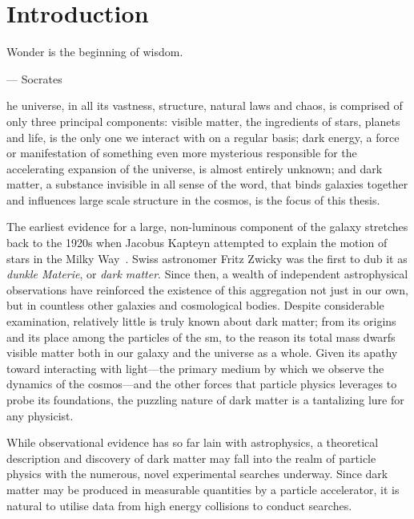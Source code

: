 %
%
\chapter{Introduction}  %
\label{chap:intro}


\epigraph{\hfill Wonder is the beginning of wisdom.}{--- Socrates}  %

he universe, in all its vastness, structure, natural laws and chaos, is comprised of only three principal components: visible matter, the ingredients of stars, planets and life, is the only one we interact with on a regular basis; dark energy, a force or manifestation of something even more mysterious responsible for the accelerating expansion of the universe, is almost entirely unknown; and dark matter, a substance invisible in all sense of the word, that binds galaxies together and influences large scale structure in the cosmos, is the focus of this thesis.

The earliest evidence for a large, non-luminous component of the galaxy stretches back to the 1920s when Jacobus Kapteyn attempted to explain the motion of stars in the Milky Way~\cite{1922ApJ....55..302K}. Swiss astronomer Fritz Zwicky was the first to dub it as \emph{dunkle Materie}, or \emph{dark matter}. Since then, a wealth of independent astrophysical observations have reinforced the existence of this aggregation not just in our own, but in countless other galaxies and cosmological bodies. Despite considerable examination, relatively little is truly known about dark matter; from its origins and its place among the particles of the \acrfull{sm}, to the reason its total mass dwarfs visible matter both in our galaxy and the universe as a whole. Given its apathy toward interacting with light---the primary medium by which we observe the dynamics of the cosmos---and the other forces that particle physics leverages to probe its foundations, the puzzling nature of dark matter is a tantalizing lure for any physicist.

While observational evidence has so far lain with astrophysics, a theoretical description and discovery of dark matter may fall into the realm of particle physics with the numerous, novel experimental searches underway. Since dark matter may be produced in measurable quantities by a particle accelerator, it is natural to utilise data from high energy collisions to conduct searches.

